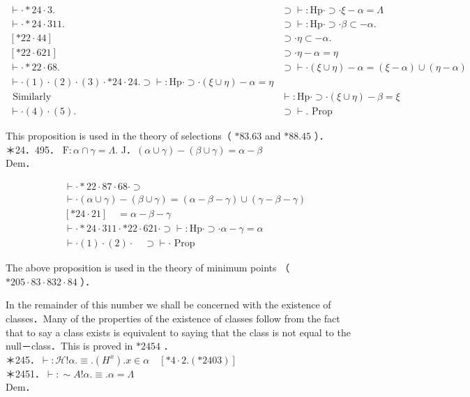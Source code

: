 \documentclass[10pt]{article}
\begin{document}
\[
\begin{array}{lc}
\vdash \cdot * 24 \cdot 3 . & \supset \vdash: \mathrm{Hp} \cdot \supset \cdot \xi-\alpha=\Lambda \\
\vdash \cdot * 24 \cdot 311 . & \supset \vdash: \mathrm{Hp} \cdot \supset \cdot \beta \subset-\alpha . \\
{[* 22 \cdot 44]} & \supset \cdot \eta \subset-\alpha . \\
{[* 22 \cdot 621]} & \supset \cdot \eta-\alpha=\eta \\
\vdash \cdot * 22 \cdot 68 . & \supset \vdash \cdot(\xi \cup \eta)-\alpha=(\xi-\alpha) \cup(\eta-\alpha) \\
\vdash \cdot(1) \cdot(2) \cdot(3) \cdot * 24 \cdot 24 . \supset \vdash: \mathrm{Hp} \cdot \supset \cdot(\xi \cup \eta)-\alpha=\eta \\
\text { Similarly } & \vdash: \mathrm{Hp} \cdot \supset \cdot(\xi \cup \eta)-\beta=\xi  \tag{5}\\
\vdash \cdot(4) \cdot(5) . & \supset \vdash . \text { Prop }
\end{array}
\]

This proposition is used in the theory of selections（ $* 83.63$ and $* 88.45$ ）．\\
＊24．495． $\mathrm{F}: \alpha \cap \gamma=\Lambda$. J．$(\alpha \cup \gamma)-(\beta \cup \gamma)=\alpha-\beta$\\
Dem．


\begin{align*}
& \vdash \cdot * 22 \cdot 87 \cdot 68 \cdot \supset \\
& \vdash \cdot(\alpha \cup \gamma)-(\beta \cup \gamma)=(\alpha-\beta-\gamma) \cup(\gamma-\beta-\gamma) \\
& {[* 24 \cdot 21] \quad=\alpha-\beta-\gamma}  \tag{1}\\
& \vdash \cdot * 24 \cdot 311 \cdot * 22 \cdot 621 \cdot \supset \vdash: \mathrm{Hp} \cdot \supset \cdot \alpha-\gamma=\alpha  \tag{2}\\
& \vdash \cdot(1) \cdot(2) \cdot \quad \supset \vdash \cdot \text { Prop }
\end{align*}


The above proposition is used in the theory of minimum points （ $* 205 \cdot 83 \cdot 832 \cdot 84$ ）．

In the remainder of this number we shall be concerned with the existence of classes．Many of the properties of the existence of classes follow from the fact that to say a class exists is equivalent to saying that the class is not equal to the null－class．This is proved in $* 2454$ ．\\
＊245．$\vdash: \mathcal{H}!\alpha . \equiv .\left(H^{x}\right) . x \in \alpha \quad[* 4 \cdot 2 .(* 2403)]$\\
＊2451．$\vdash: \sim A!\alpha . \equiv . \alpha=\Lambda$\\
Dem．
\end{document}
